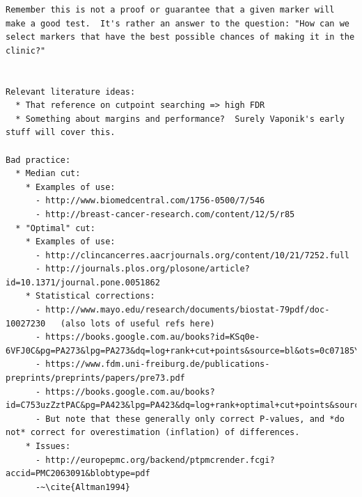 \documentclass[dissertation.tex]{subfiles}
\begin{document}
\begin{verbatim}
Remember this is not a proof or guarantee that a given marker will make a good test.  It's rather an answer to the question: "How can we select markers that have the best possible chances of making it in the clinic?"


Relevant literature ideas:
  * That reference on cutpoint searching => high FDR
  * Something about margins and performance?  Surely Vaponik's early stuff will cover this.

Bad practice:
  * Median cut:
    * Examples of use:
      - http://www.biomedcentral.com/1756-0500/7/546
      - http://breast-cancer-research.com/content/12/5/r85
  * "Optimal" cut: 
    * Examples of use: 
      - http://clincancerres.aacrjournals.org/content/10/21/7252.full
      - http://journals.plos.org/plosone/article?id=10.1371/journal.pone.0051862
    * Statistical corrections:
      - http://www.mayo.edu/research/documents/biostat-79pdf/doc-10027230   (also lots of useful refs here)
      - https://books.google.com.au/books?id=KSq0e-6VFJ0C&pg=PA273&lpg=PA273&dq=log+rank+cut+points&source=bl&ots=0c07185Yb1&sig=Y7g8m9U0LHepQr1FxjrJzE0_rv8&hl=en&sa=X&ei=Lj_6VJII1OPwBY7ZgZgE&ved=0CEEQ6AEwBg#v=onepage&q=log%20rank%20cut%20points&f=false
      - https://www.fdm.uni-freiburg.de/publications-preprints/preprints/papers/pre73.pdf
      - https://books.google.com.au/books?id=C753uzZztPAC&pg=PA423&lpg=PA423&dq=log+rank+optimal+cut+points&source=bl&ots=__ay7uRwZ4&sig=e4IF1oKV71mw8XYU5qUiSl7JQ3g&hl=en&sa=X&ei=1z_6VOu1CImG8QW4o4LQAw&ved=0CFcQ6AEwCA#v=onepage&q=log%20rank%20optimal%20cut%20points&f=false
      - But note that these generally only correct P-values, and *do not* correct for overestimation (inflation) of differences.
    * Issues: 
      - http://europepmc.org/backend/ptpmcrender.fcgi?accid=PMC2063091&blobtype=pdf
      -~\cite{Altman1994}
\end{verbatim}
\end{document}
